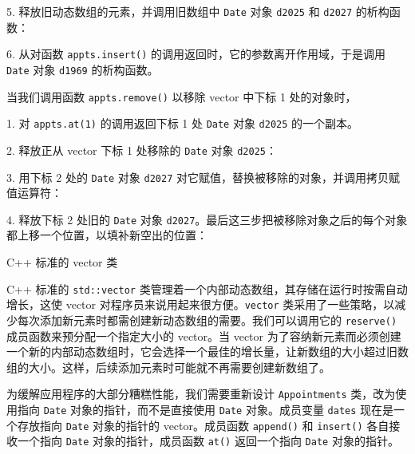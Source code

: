5. 释放旧动态数组的元素，并调用旧数组中 \texttt{Date} 对象 \texttt{d2025} 和 \texttt{d2027} 的析构函数：


6. 从对函数 \texttt{appts.\allowbreak{}insert(\allowbreak{})\allowbreak{}} 的调用返回时，它的参数离开作用域，于是调用 \texttt{Date} 对象 \texttt{d1969} 的析构函数。

当我们调用函数 \texttt{appts.\allowbreak{}remove(\allowbreak{})\allowbreak{}} 以移除 vector 中下标 1 处的对象时，

1. 对 \texttt{appts.\allowbreak{}at(\allowbreak{}1)\allowbreak{}} 的调用返回下标 1 处 \texttt{Date} 对象 \texttt{d2025} 的一个副本。

2. 释放正从 vector 下标 1 处移除的 \texttt{Date} 对象 \texttt{d2025}：


3. 用下标 2 处的 \texttt{Date} 对象 \texttt{d2027} 对它赋值，替换被移除的对象，并调用拷贝赋值运算符：


4. 释放下标 2 处旧的 \texttt{Date} 对象 \texttt{d2027}。最后这三步把被移除对象之后的每个对象都上移一个位置，以填补新空出的位置：


\begin{mySidebar}{C++ 标准的 vector 类}

C++ 标准的 \texttt{std::\allowbreak{}vector} 类管理着一个内部动态数组，其存储在运行时按需自动增长，这使 vector 对程序员来说用起来很方便。\texttt{vector} 类采用了一些策略，以减少每次添加新元素时都需创建新动态数组的需要。我们可以调用它的 \texttt{reserve()} 成员函数来预分配一个指定大小的 vector。当 vector 为了容纳新元素而必须创建一个新的内部动态数组时，它会选择一个最佳的增长量，让新数组的大小超过旧数组的大小。这样，后续添加元素时可能就不再需要创建新数组了。
\end{mySidebar}

为缓解应用程序的大部分糟糕性能，我们需要重新设计 \texttt{Appointments} 类，改为使用指向 \texttt{Date} 对象的指针，而不是直接使用 \texttt{Date} 对象。成员变量 \texttt{dates} 现在是一个存放指向 \texttt{Date} 对象的指针的 vector。成员函数 \texttt{append()} 和 \texttt{insert()} 各自接收一个指向 \texttt{Date} 对象的指针，成员函数 \texttt{at()} 返回一个指向 \texttt{Date} 对象的指针。

